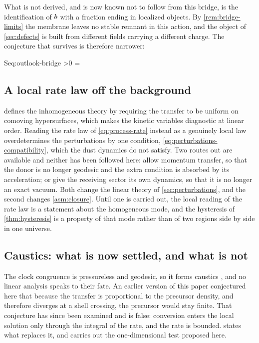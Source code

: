 What is not derived, and is now known not to follow from this bridge, is the
identification of $b$ with a fraction ending in localized objects. By
\cref{rem:bridge-limits} the membrane leaves no stable remnant in this action,
and the object of \cref{sec:defects} is built from different fields carrying a
different charge. The conjecture that survives is therefore narrower:
%
\begin{keyresult}{S}{eq:outlook-bridge}
  \quad
  >0
  \quad{}\quad
  \bfrac=
  \quad{}
\end{keyresult}

\subsection{A local rate law off the background}\label{sec:outlook-local-rate}

 defines the inhomogeneous theory by requiring the transfer
to be uniform on comoving hypersurfaces, which makes the kinetic variables
diagnostic at linear order. Reading the rate law of \cref{eq:process-rate}
instead as a genuinely local law overdetermines the perturbations by one
condition, \cref{eq:perturbations-compatibility}, which the dust dynamics do
not satisfy. Two routes out are available and neither has been followed here:
allow momentum transfer, so that the donor is no longer geodesic and the extra
condition is absorbed by its acceleration; or give the receiving sector its own
dynamics, so that it is no longer an exact vacuum. Both change the linear
theory of \cref{sec:perturbations}, and the second changes
\cref{asm:closure}. Until one is carried out, the local reading of the rate
law is a statement about the homogeneous mode, and the hysteresis of
\cref{thm:hysteresis} is a property of that mode rather than of two regions
side by side in one universe.

\subsection{Caustics: what is now settled, and what is not}
\label{sec:outlook-caustics}

The clock congruence is pressureless and geodesic, so it forms caustics
\parencite{babichev2017_170403367}, and no linear analysis speaks to their
fate. An earlier version of this paper conjectured here that because the
transfer is proportional to the precursor density, and therefore diverges at a
shell crossing, the precursor would stay finite. That conjecture has since been
examined and is false: conversion enters the local solution only through the
integral of the rate, and the rate is bounded.
 states what replaces it, and carries out the
one-dimensional test proposed here.


